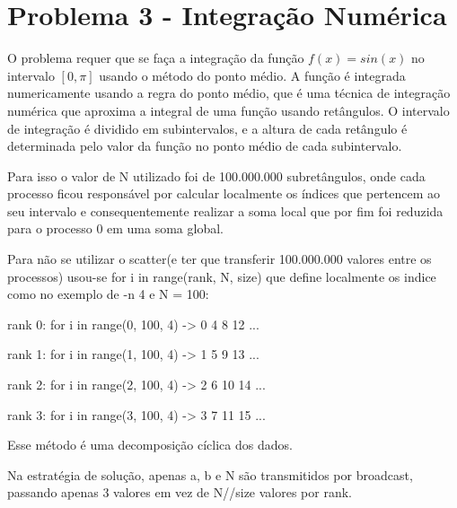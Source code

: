 \section{Problema 3 - Integração Numérica}
O problema requer que se faça a integração da função $f(x) = sin(x)$ no intervalo $[0, \pi]$ usando o método do ponto médio. A função é integrada numericamente usando a regra do ponto médio, que é uma técnica de integração numérica que aproxima a integral de uma função usando retângulos. O intervalo de integração é dividido em subintervalos, e a altura de cada retângulo é determinada pelo valor da função no ponto médio de cada subintervalo.

Para isso o valor de N utilizado foi de 100.000.000 subretângulos, onde cada processo ficou responsável por calcular localmente os índices que pertencem ao seu intervalo e consequentemente realizar a soma local que por fim foi reduzida para o processo 0 em uma soma global. 

Para não se utilizar o scatter(e ter que transferir 100.000.000 valores entre os processos) usou-se for i in range(rank, N, size) que define localmente os indice como no exemplo de -n 4 e N = 100:

rank 0:
  for i in range(0, 100, 4) -> 0 4 8 12 ... 

rank 1:
  for i in range(1, 100, 4) -> 1 5 9 13 ...

rank 2: 
  for i in range(2, 100, 4) -> 2 6 10 14 ...

rank 3:
  for i in range(3, 100, 4) -> 3 7 11 15 ...

Esse método é uma decomposição cíclica dos dados.

Na estratégia de solução, apenas a, b e N são transmitidos por broadcast, passando apenas 3 valores em vez de N//size valores por rank. 
